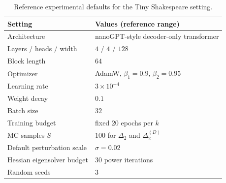 \documentclass[10pt]{article}
\theoremstyle{plain}
\theoremstyle{remark}
\begin{document}
\begin{table}[t]
  \centering
  \small
  \begin{tabular}{ll}
    \hline
    Setting & Values (reference range) \\
    \hline
    Architecture & nanoGPT-style decoder-only transformer \\
    Layers / heads / width & $4$ / $4$ / $128$ \\
    Block length & $64$ \\
    Optimizer & AdamW, $\beta_1=0.9$, $\beta_2=0.95$ \\
    Learning rate & $3\times 10^{-4}$ \\
    Weight decay & $0.1$ \\
    Batch size & $32$ \\
    Training budget & fixed $20$ epochs per $k$ \\
    MC samples $S$ & $100$ for $\Delta_2$ and $\Delta_2^{(D)}$ \\
    Default perturbation scale & $\sigma=0.02$ \\
    Hessian eigensolver budget & $30$ power iterations \\
    Random seeds & $3$ \\
    \hline
  \end{tabular}
  \caption{Reference experimental defaults for the Tiny Shakespeare setting.}
  \label{tab:exp-hparams}
\end{table}
\end{document}
